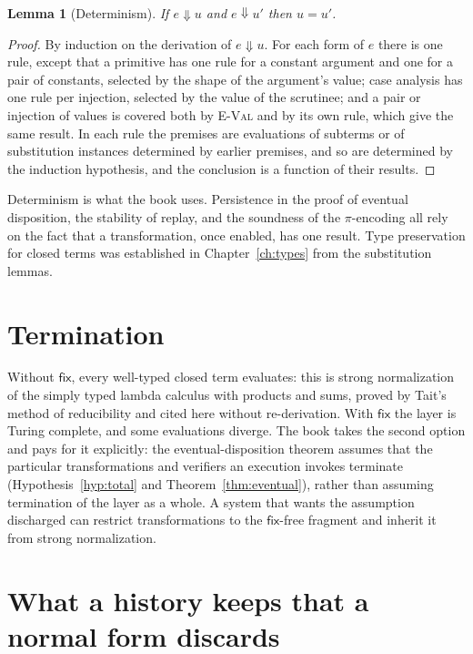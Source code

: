 \documentclass[11pt,openany]{book}
\newtheorem{lemma}[theorem]{Lemma}
\theoremstyle{remark}
\begin{document}
\begin{lemma}[Determinism]\label{lem:det}
If $e\Downarrow u$ and $e\Downarrow u'$ then $u=u'$.
\end{lemma}

\begin{proof}
By induction on the derivation of $e\Downarrow u$. For each form of $e$
there is one rule, except that a primitive has one rule for a constant
argument and one for a pair of constants, selected by the shape of the
argument's value; case analysis has one rule per injection, selected by
the value of the scrutinee; and a pair or injection of values is covered
both by \textsc{E-Val} and by its own rule, which give the same result. In
each rule the premises are evaluations of subterms or of substitution
instances determined by earlier premises, and so are determined by the
induction hypothesis, and the conclusion is a function of their results.
\end{proof}

Determinism is what the book uses. Persistence in the proof of eventual
disposition, the stability of replay, and the soundness of the
$\pi$-encoding all rely on the fact that a transformation, once enabled,
has one result. Type preservation for closed terms was established in
Chapter~\ref{ch:types} from the substitution lemmas.

\section{Termination}

Without $\mathsf{fix}$, every well-typed closed term evaluates: this is
strong normalization of the simply typed lambda calculus with products
and sums, proved by Tait's method of reducibility and cited here without
re-derivation. With $\mathsf{fix}$ the layer is Turing complete, and some
evaluations diverge. The book takes the second option and pays for it
explicitly: the eventual-disposition theorem assumes that the particular
transformations and verifiers an execution invokes terminate
(Hypothesis~\ref{hyp:total} and Theorem~\ref{thm:eventual}), rather than
assuming termination of the layer as a whole. A system that wants the
assumption discharged can restrict transformations to the $\mathsf{fix}$-free
fragment and inherit it from strong normalization.

\section{What a history keeps that a normal form discards}
\end{document}
